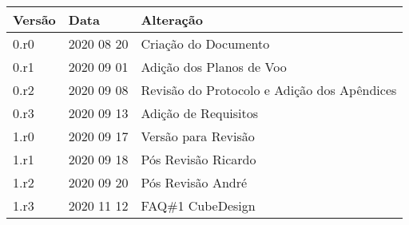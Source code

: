 
%
%
\begin{tabular}{|p{}|p{}|p{}|}
    \hline
    \textbf{Versão} & \textbf{Data} & \textbf{Alteração} \\ \hline
    0.r0 & 2020 08 20 & Criação do Documento \\ \hline
    0.r1 & 2020 09 01 & Adição dos Planos de Voo \\ \hline
    0.r2 & 2020 09 08 & Revisão do Protocolo e Adição dos Apêndices \\ \hline
    0.r3 & 2020 09 13 & Adição de Requisitos \\ \hline
    1.r0 & 2020 09 17 & Versão para Revisão \\ \hline
    1.r1 & 2020 09 18 & Pós Revisão Ricardo \\ \hline
    1.r2 & 2020 09 20 & Pós Revisão André \\ \hline
    1.r3 & 2020 11 12 & FAQ\#1 CubeDesign \\ \hline
\end{tabular}
